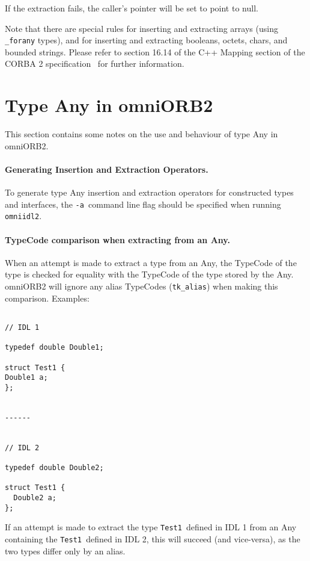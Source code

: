 \documentclass[11pt,twoside,onecolumn]{book}
\begin{document}
If the extraction fails, the caller's pointer will be set to point to null.

Note that there are special rules for inserting and extracting arrays (using 
{\tt \_forany} types), and for inserting and extracting booleans, octets,
chars, and bounded strings. Please refer to section 16.14 of the C++ Mapping 
section of the CORBA 2 specification~\cite{corba2-spec} for further 
information. 


\section{Type Any in omniORB2}
\label{anyOmniORB2}

This section contains some notes on the use and behaviour of type Any in 
omniORB2.

\paragraph*{Generating Insertion and Extraction Operators.}
To generate type Any insertion and extraction operators for constructed 
types and interfaces, the {\tt -a }command line flag should be specified when 
running {\tt omniidl2}. 

\paragraph*{TypeCode comparison when extracting from an Any.}
When an attempt is made to extract a type from an Any, the TypeCode of the 
type is checked for equality with the TypeCode of the type stored by the 
Any. omniORB2 will ignore any alias TypeCodes ({\tt tk\_alias}) when 
making this comparison. Examples:

{\small
\begin{verbatim}

// IDL 1

typedef double Double1;

struct Test1 {
Double1 a;
};


------


// IDL 2

typedef double Double2;

struct Test1 {
  Double2 a;
};

\end{verbatim}
}
    
If an attempt is made to extract the type {\tt Test1 }defined in IDL 1 from an
Any containing the {\tt Test1 }defined in IDL 2, this will succeed (and 
vice-versa), as the two types differ only by an alias. 
\end{document}

